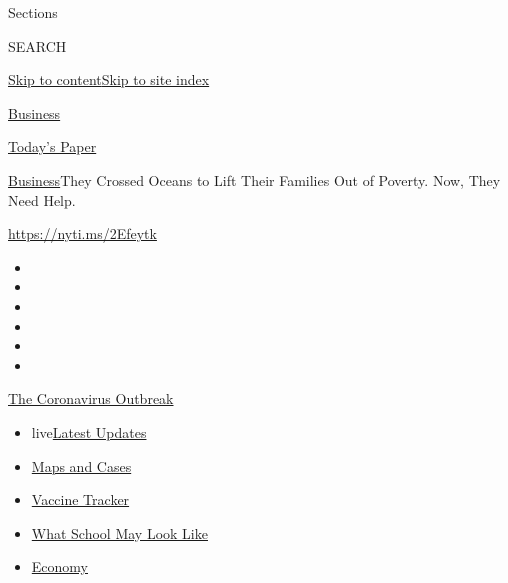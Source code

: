 Sections

SEARCH

\protect\hyperlink{site-content}{Skip to
content}\protect\hyperlink{site-index}{Skip to site index}

\href{https://www.nytimes3xbfgragh.onion/section/business}{Business}

\href{https://myaccount.nytimes3xbfgragh.onion/auth/login?response_type=cookie\&client_id=vi}{}

\href{https://www.nytimes3xbfgragh.onion/section/todayspaper}{Today's
Paper}

\href{/section/business}{Business}\textbar{}They Crossed Oceans to Lift
Their Families Out of Poverty. Now, They Need Help.

\url{https://nyti.ms/2Efeytk}

\begin{itemize}
\item
\item
\item
\item
\item
\item
\end{itemize}

\href{https://www.nytimes3xbfgragh.onion/news-event/coronavirus?action=click\&pgtype=Article\&state=default\&region=TOP_BANNER\&context=storylines_menu}{The
Coronavirus Outbreak}

\begin{itemize}
\tightlist
\item
  live\href{https://www.nytimes3xbfgragh.onion/2020/08/01/world/coronavirus-covid-19.html?action=click\&pgtype=Article\&state=default\&region=TOP_BANNER\&context=storylines_menu}{Latest
  Updates}
\item
  \href{https://www.nytimes3xbfgragh.onion/interactive/2020/us/coronavirus-us-cases.html?action=click\&pgtype=Article\&state=default\&region=TOP_BANNER\&context=storylines_menu}{Maps
  and Cases}
\item
  \href{https://www.nytimes3xbfgragh.onion/interactive/2020/science/coronavirus-vaccine-tracker.html?action=click\&pgtype=Article\&state=default\&region=TOP_BANNER\&context=storylines_menu}{Vaccine
  Tracker}
\item
  \href{https://www.nytimes3xbfgragh.onion/interactive/2020/07/29/us/schools-reopening-coronavirus.html?action=click\&pgtype=Article\&state=default\&region=TOP_BANNER\&context=storylines_menu}{What
  School May Look Like}
\item
  \href{https://www.nytimes3xbfgragh.onion/live/2020/07/31/business/stock-market-today-coronavirus?action=click\&pgtype=Article\&state=default\&region=TOP_BANNER\&context=storylines_menu}{Economy}
\end{itemize}

